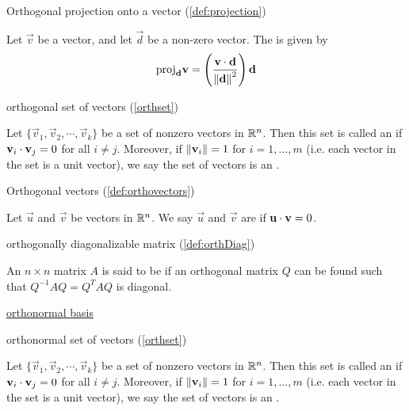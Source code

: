 \documentclass{ximera}
\begin{document}
Orthogonal projection onto a vector (\ref{def:projection})
\begin{expandable}
    Let $\vec{v}$ be a vector, and let $\vec{d}$ be a non-zero vector.  The  is given by 
$$\mbox{proj}_{\mathbf{d}}\mathbf{v}=\left(\frac{\mathbf{v}\cdot\mathbf{d}}{\left\lVert\mathbf{d}\right\rVert^2}\right)\mathbf{d}$$
\end{expandable}

orthogonal set of vectors (\ref{orthset})
\begin{expandable}
    Let $\{ \vec{v}_1, \vec{v}_2, \cdots, \vec{v}_k \}$ be a set of nonzero
vectors in $\mathbb{R}^n$. Then this set is called an
 if 
$\mathbf{v}_i \cdot \mathbf{v}_j = 0$ for all $i \neq j$.
Moreover, if $\left\lVert\mathbf{v}_i\right\rVert=1$ for $i=1,\ldots,m$ (i.e. each vector in the set is a unit vector), we say the set of vectors is an .
\end{expandable}

Orthogonal vectors (\ref{def:orthovectors}) 
\begin{expandable}
Let $\vec{u}$ and $\vec{v}$ be vectors in $\mathbb{R}^n$. We say $\vec{u}$ and $\vec{v}$ are  if $\mathbf{u}\cdot \mathbf{v}=0$.
\end{expandable}


orthogonally diagonalizable matrix (\ref{def:orthDiag})
\begin{expandable}
    An $n \times n$ matrix $A$ is said to be  if an orthogonal matrix $Q$ can be found such that  $Q^{-1}AQ = Q^{T}AQ$ is diagonal.
\end{expandable}

\href{https://ximera.osu.edu/oerlinalg/LinearAlgebra/RTH-0010/main}{orthonormal basis}

orthonormal set of vectors (\ref{orthset})
\begin{expandable}
    Let $\{ \vec{v}_1, \vec{v}_2, \cdots, \vec{v}_k \}$ be a set of nonzero
vectors in $\mathbb{R}^n$. Then this set is called an
 if 
$\mathbf{v}_i \cdot \mathbf{v}_j = 0$ for all $i \neq j$.
Moreover, if $\left\lVert\mathbf{v}_i\right\rVert=1$ for $i=1,\ldots,m$ (i.e. each vector in the set is a unit vector), we say the set of vectors is an .
\end{expandable}

\end{document}

